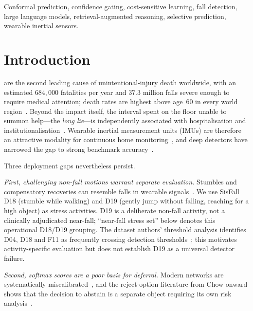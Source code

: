 \documentclass[journal]{IEEEtran}
\begin{document}
\begin{IEEEkeywords}
Conformal prediction, confidence gating, cost-sensitive learning, fall detection, large language models, retrieval-augmented reasoning, selective prediction, wearable inertial sensors.
\end{IEEEkeywords}

\section{Introduction}
\label{sec:intro}

 are the second leading cause of unintentional-injury death worldwide, with an estimated $684{,}000$ fatalities per year and $37.3$ million falls severe enough to require medical attention; death rates are highest above age~60 in every world region~\cite{who2021falls}. Beyond the impact itself, the interval spent on the floor unable to summon help---the \emph{long lie}---is independently associated with hospitalisation and institutionalisation~\cite{fleming2008longlie,tinetti1997falls}. Wearable inertial measurement units (IMUs) are therefore an attractive modality for continuous home monitoring~\cite{iglesias2019wearable,nurek2020fallsurvey,khan2017review,sisfall2017}, and deep detectors have narrowed the gap to strong benchmark accuracy~\cite{ren2021survey,mubashir2013survey}.

Three deployment gaps nevertheless persist.

\emph{First, challenging non-fall motions warrant separate evaluation.} Stumbles and compensatory recoveries can resemble falls in wearable signals~\cite{aziz2016fall,aziz2012nearfall,aziz2014causes}. We use SisFall D18 (stumble while walking) and D19 (gently jump without falling, reaching for a high object) as stress activities. D19 is a deliberate non-fall activity, not a clinically adjudicated near-fall; ``near-fall stress set'' below denotes this operational D18/D19 grouping. The dataset authors' threshold analysis identifies D04, D18 and F11 as frequently crossing detection thresholds~\cite{sisfall2017}; this motivates activity-specific evaluation but does not establish D19 as a universal detector failure.

\emph{Second, softmax scores are a poor basis for deferral.} Modern networks are systematically miscalibrated~\cite{guo2017calibration,lakshminarayanan2017ensembles}, and the reject-option literature from Chow onward shows that the decision to abstain is a separate object requiring its own risk analysis~\cite{chow1970reject,el2010foundations,geifman2017selective,cortes2016rejection}.
\end{document}
